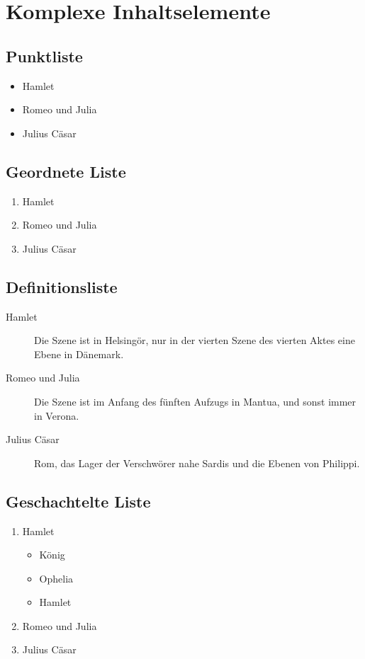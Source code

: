 \chapter{Komplexe Inhaltselemente}

\section{Punktliste}

\begin{itemize}
  \item Hamlet
  \item Romeo und Julia
  \item Julius Cäsar
\end{itemize}

\section{Geordnete Liste}

\begin{enumerate}
  \item Hamlet
  \item Romeo und Julia
  \item Julius Cäsar
\end{enumerate}

\section{Definitionsliste}

\begin{description}
  \item [Hamlet] Die Szene ist in Helsingör, nur in der vierten Szene des
  vierten Aktes eine Ebene in Dänemark.
  \item [Romeo und Julia] Die Szene ist im Anfang des fünften Aufzugs in
  Mantua, und sonst immer in Verona.
  \item [Julius Cäsar] Rom, das Lager der Verschwörer nahe Sardis und die Ebenen
  von Philippi.
\end{description}

\section{Geschachtelte Liste}

\begin{enumerate}
\item Hamlet
  \begin{itemize}
  \item König
  \item Ophelia
  \item Hamlet
  \end{itemize}
\item Romeo und Julia
\item Julius Cäsar
\end{enumerate}

